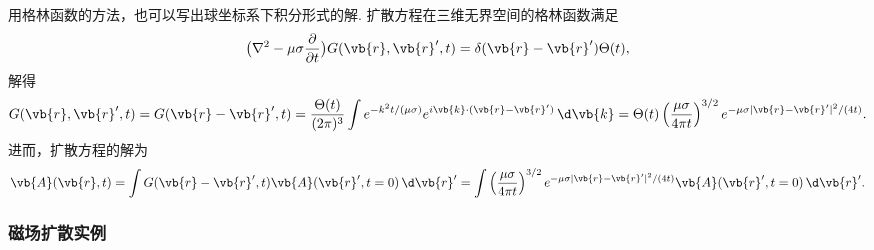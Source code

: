 \begin{notes}
	用格林函数的方法，也可以写出球坐标系下积分形式的解.
	扩散方程在三维无界空间的格林函数满足
	\begin{equation*}
		\bigl(\nabla^2 - \mu\sigma \frac{\partial}{\partial t}\bigr) G(\vb{r},\vb{r}',t) = \delta(\vb{r} - \vb{r}') \Theta(t),
	\end{equation*}
	解得
	\begin{equation*}
		G(\vb{r},\vb{r}',t) = G(\vb{r} - \vb{r}',t)
		= \frac{\Theta(t)}{(2\pi)^3} \int e^{-k^2 t/(\mu\sigma)} e^{i\vb{k}\cdot(\vb{r} - \vb{r}')} \,\d \vb{k}
		= \Theta(t) \left(\frac{\mu\sigma}{4\pi t}\right)^{3/2} e^{-\mu\sigma |\vb{r} - \vb{r}'|^2/(4t)}.
	\end{equation*}
	进而，扩散方程的解为
	\begin{equation*}
		\vb{A}(\vb{r},t) = \int G(\vb{r} - \vb{r}',t) \vb{A}(\vb{r}',t=0) \,\d \vb{r}'
		= \int \left(\frac{\mu\sigma}{4\pi t}\right)^{3/2} e^{-\mu\sigma |\vb{r} - \vb{r}'|^2/(4t)} \vb{A}(\vb{r}',t=0) \,\d \vb{r}'.
	\end{equation*}
\end{notes}

\subsubsection{磁场扩散实例}

